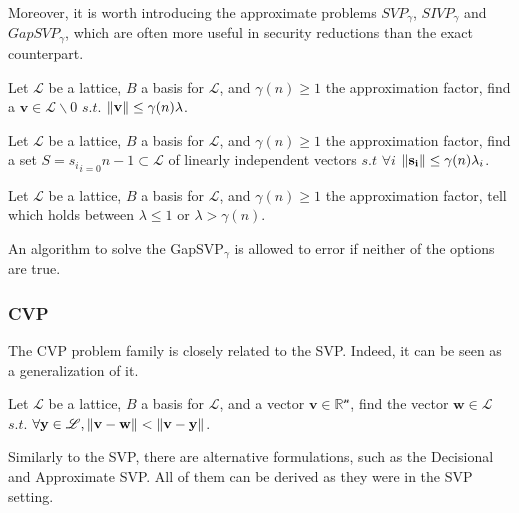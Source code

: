 Moreover, it is worth introducing the approximate problems $SVP_\gamma$, $SIVP_\gamma$ and $GapSVP_\gamma$, which are often more useful in security reductions than the exact counterpart.

\begin{definition}
Let $\mathscr{L}$ be a lattice, $B$ a basis for $\mathscr{L}$, and $\gamma(n)\geq1$ the approximation factor, find a $\mathbf{v}\in\mathscr{L}\backslash0$ $s.t.$ $\left\lVert \mathbf{v} \right\rVert \leq \gamma(n)\lambda$.
\end{definition}

\begin{definition}
Let $\mathscr{L}$ be a lattice, $B$ a basis for $\mathscr{L}$, and $\gamma(n)\geq1$ the approximation factor, find a set $S={s_i}_{i=0}{n-1}\subset \mathscr{L}$ of linearly independent vectors $s.t$ $\forall i$ $\left\lVert \mathbf{s_i} \right\rVert \leq \gamma(n)\lambda_i$.
\end{definition}

\begin{definition}
Let $\mathscr{L}$ be a lattice, $B$ a basis for $\mathscr{L}$, and $\gamma(n)\geq1$ the approximation factor, tell which holds between $\lambda\leq1$ or $\lambda > \gamma(n)$.
\end{definition}
\begin{remark}
An algorithm to solve the GapSVP$_\gamma$ is allowed to error if neither of the options are true.
\end{remark}

\subsubsection{CVP}
The CVP problem family is closely related to the SVP. Indeed, it can be seen as a generalization of it.

\begin{definition}
Let $\mathscr{L}$ be a lattice, $B$ a basis for $\mathscr{L}$, and a vector $\mathbf{v}\in\mathscr{\mathbb{R}^n}$, find the vector $\mathbf{w}\in\mathscr{L}$ $s.t.$ $\forall\mathbf{y}\in\mathscr{L},\left\lVert \mathbf{v}-\mathbf{w} \right\rVert < \left\lVert \mathbf{v}-\mathbf{y} \right\rVert$.
\end{definition}

Similarly to the SVP, there are alternative formulations, such as the Decisional and Approximate SVP. All of them can be derived as they were in the SVP setting.

